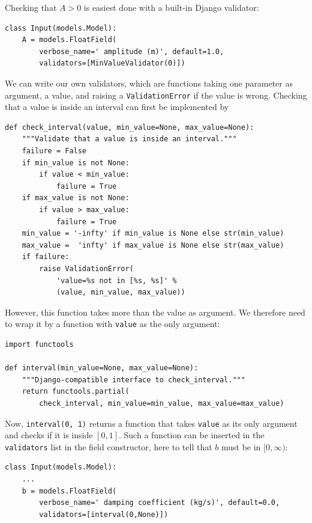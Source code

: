 \documentclass[%
oneside,                 %
final,                   %
10pt]{article}
\begin{document}
Checking that $A>0$ is easiest done with a built-in Django
validator:

\begin{Verbatim}[numbers=none,fontsize=\fontsize{9pt}{9pt},baselinestretch=0.85]
class Input(models.Model):
    A = models.FloatField(
        verbose_name=' amplitude (m)', default=1.0,
        validators=[MinValueValidator(0)])
\end{Verbatim}

We can write our own validators, which are functions taking one parameter
as argument, a value, and raising a \Verb!ValidationError! if the value
is wrong. Checking that a value is inside an interval can first be
implemented by

\begin{Verbatim}[numbers=none,fontsize=\fontsize{9pt}{9pt},baselinestretch=0.85]
def check_interval(value, min_value=None, max_value=None):
    """Validate that a value is inside an interval."""
    failure = False
    if min_value is not None:
        if value < min_value:
            failure = True
    if max_value is not None:
        if value > max_value:
            failure = True
    min_value = '-infty' if min_value is None else str(min_value)
    max_value =  'infty' if max_value is None else str(max_value)
    if failure:
        raise ValidationError(
            'value=%s not in [%s, %s]' %
            (value, min_value, max_value))
\end{Verbatim}
However, this function takes more than the value as argument. We therefore
need to wrap it by a function with \Verb!value! as the only argument:

\begin{Verbatim}[numbers=none,fontsize=\fontsize{9pt}{9pt},baselinestretch=0.85]
import functools

def interval(min_value=None, max_value=None):
    """Django-compatible interface to check_interval."""
    return functools.partial(
        check_interval, min_value=min_value, max_value=max_value)
\end{Verbatim}
Now, \Verb!interval(0, 1)! returns a function that takes \Verb!value! as its
only argument and checks if it is inside $[0,1]$.
Such a function can be inserted in the \Verb!validators! list in
the field constructor, here to tell that $b$ must be in $[0,\infty)$:

\begin{Verbatim}[numbers=none,fontsize=\fontsize{9pt}{9pt},baselinestretch=0.85]
class Input(models.Model):
    ...
    b = models.FloatField(
        verbose_name=' damping coefficient (kg/s)', default=0.0,
        validators=[interval(0,None)])
\end{Verbatim}
\end{document}
